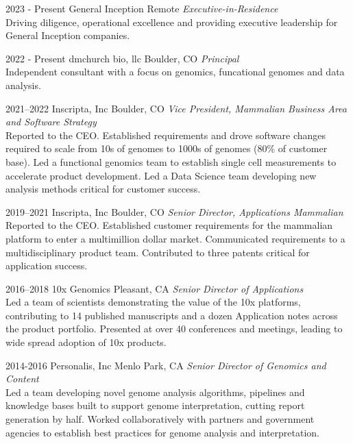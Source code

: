 \documentclass[]{dmc-cv} %
\begin{document}
\begin{entrylist}
    \entry
    {2023 - Present}
    {General Inception}
    {Remote}
    {\emph{Executive-in-Residence}\\
    Driving diligence, operational excellence and providing executive leadership for General Inception companies. }
    
    \entry
    {2022 - Present}
    {dmchurch bio, llc}
    {Boulder, CO}
    {\emph{Principal}\\
    Independent consultant with a focus on genomics, funcational genomes and data analysis. 
    }
    
    \entry
    {2021--2022}
    {Inscripta, Inc}
    {Boulder, CO}
    {\emph{Vice President, Mammalian Business Area and Software Strategy}\\
    Reported to the CEO. Established requirements and drove software changes required to scale from 10s of genomes to 1000s of 
    genomes (80\% of customer base).  Led a functional genomics team to establish single cell measurements to accelerate product development.
    Led a Data Science team developing new analysis methods critical for customer success. 
    }
    
    \entry
    {2019--2021}
    {Inscripta, Inc}
    {Boulder, CO}
    {\emph{Senior Director, Applications Mammalian}\\
    Reported to the CEO. Established customer requirements for the mammalian platform to enter a multimillion dollar market. 
    Communicated requirements to a multidisciplinary product team. Contributed to three patents critical for application success.
    }
    
    \entry
    {2016--2018}
    {10x Genomics}
    {Pleasant, CA}
    {\emph{Senior Director of Applications} \\
    Led a team of scientists demonstrating the value of the 10x platforms, 
    contributing to 14 published manuscripts and a dozen Application notes across the product portfolio. 
    Presented at over 40 conferences and meetings, leading to wide spread adoption of 10x products. 
    }
    
    \entry
    {2014-2016}
    {Personalis, Inc}
    {Menlo Park, CA}
    {\emph{Senior Director of Genomics and Content} \\
    Led a team developing novel genome analysis algorithms, pipelines and knowledge bases built to support genome 
    interpretation, cutting report generation by half. Worked collaboratively with partners and government agencies 
    to establish best practices for genome analysis and interpretation. 
    }
    

\end{entrylist}
\end{document}
